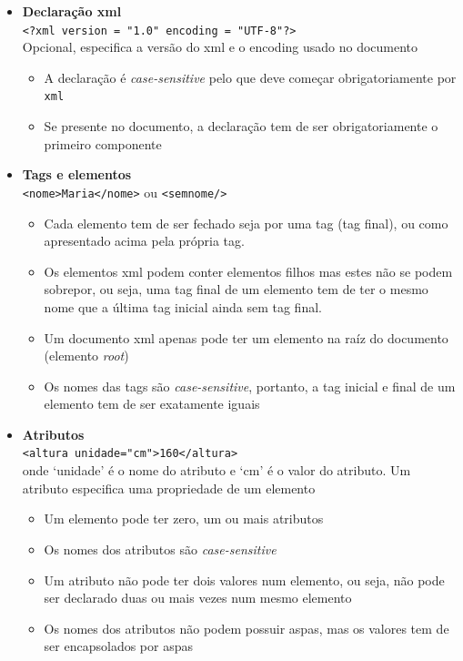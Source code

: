 \begin{itemize}
    \item \textbf{Declaração \acrshort{xml}} \\
    \verb|<?xml version = "1.0" encoding = "UTF-8"?>| \\
    Opcional, especifica a versão do \acrshort{xml} e o encoding usado no documento
    \begin{itemize}
        \item A declaração é \textit{case-sensitive} pelo que deve começar obrigatoriamente por \texttt{xml}
        \item Se presente no documento, a declaração tem de ser obrigatoriamente o primeiro componente
    \end{itemize}
    \item \textbf{Tags e elementos} \\
    \verb|<nome>Maria</nome>| ou \verb|<semnome/>|
    \begin{itemize}
        \item Cada elemento tem de ser fechado seja por uma tag (tag final), ou como apresentado acima pela própria tag.
        \item Os elementos \acrshort{xml} podem conter elementos filhos mas estes não se podem sobrepor, ou seja, uma tag final de um elemento tem de ter o mesmo nome que a última tag inicial ainda sem tag final. 
        \item Um documento \acrshort{xml} apenas pode ter um elemento na raíz do documento (elemento \textit{root})
        \item Os nomes das tags são \textit{case-sensitive}, portanto, a tag inicial e final de um elemento tem de ser exatamente iguais
    \end{itemize}
    \item \textbf{Atributos} \\
    \verb|<altura unidade="cm">160</altura>| \\
    onde `unidade' é o nome do atributo e `cm' é o valor do atributo. Um atributo especifica uma propriedade de um elemento
    \begin{itemize}
        \item Um elemento pode ter zero, um ou mais atributos
        \item Os nomes dos atributos são \textit{case-sensitive}
        \item Um atributo não pode ter dois valores num elemento, ou seja, não pode ser declarado duas ou mais vezes num mesmo elemento
        \item Os nomes dos atributos não podem possuir aspas, mas os valores tem de ser encapsolados por aspas

\end{itemize}
\end{itemize}
